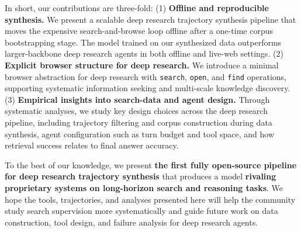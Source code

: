 In short, our contributions are three-fold:
(1) \textbf{Offline and reproducible synthesis.} We present a scalable deep research trajectory synthesis pipeline that moves the expensive search-and-browse loop offline after a one-time corpus bootstrapping stage. The model trained on our synthesized data outperforms larger-backbone deep research agents in both offline and live-web settings.  
(2) \textbf{Explicit browser structure for deep research.} We introduce a minimal browser abstraction for deep research with \texttt{search}, \texttt{open}, and \texttt{find} operations, supporting systematic information seeking and multi-scale knowledge discovery.
(3) \textbf{Empirical insights into search-data and agent design.} Through systematic analyses, we study key design choices across the deep research pipeline, including trajectory filtering and corpus construction during data synthesis, agent configuration such as turn budget and tool space, and how retrieval success relates to final answer accuracy.

To the best of our knowledge, we present \textbf{the first fully open-source pipeline for deep research trajectory synthesis} that produces a model \textbf{rivaling proprietary systems on long-horizon search and reasoning tasks}.
We hope the tools, trajectories, and analyses presented here will help the community study search supervision more systematically and guide future work on data construction, tool design, and failure analysis for deep research agents.




